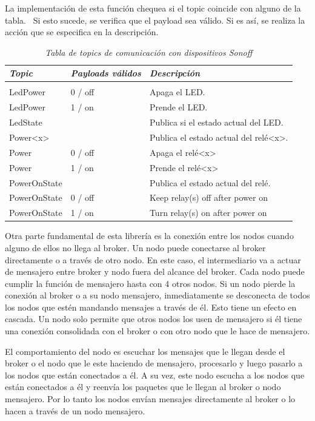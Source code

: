 La implementación de esta función chequea si el topic coincide con alguno de la tabla.~ Si esto sucede, se verifica que el payload sea válido. Si es así, se realiza la acción que se especifica en la descripción.
\begin{table}[h]
\begin{tabular}{p{}p{}p{}}
\toprule
\textit{Topic} & \textit{Payloads válidos} & \textit{Descripción} \\
\midrule \\
\rowcolor{green!5} LedPower & 0 / off & Apaga el LED. \\
LedPower & 1 / on & Prende el LED. \\
\rowcolor{green!5} LedState & & Publica si el estado actual del LED. \\
Power<x> & & Publica el estado actual del relé<x>. \\
\rowcolor{green!5} Power & 0 / off & Apaga el relé<x> \\
Power & 1 / on & Prende el relé<x> \\
\rowcolor{green!5} PowerOnState &  & Publica el estado actual del relé. \\
PowerOnState & 0 / off & Keep relay(s) off after power on \\
\rowcolor{green!5} PowerOnState & 1 / on & Turn relay(s) on after power on \\
\bottomrule
\end{tabular}
 \caption{\textit{Tabla de topics de comunicación con dispositivos Sonoff}}
 \label{tbl:topics}
\end{table}

Otra parte fundamental de esta librería es la conexión entre los nodos cuando alguno de ellos no llega al broker. Un nodo puede conectarse al broker directamente o a través de otro nodo. En este caso, el intermediario va a actuar de mensajero entre broker y nodo fuera del alcance del broker. Cada nodo puede cumplir la función de mensajero hasta con 4 otros nodos. Si un nodo pierde la conexión al broker o a su nodo mensajero, inmediatamente se desconecta de todos los nodos que estén mandando mensajes a través de él. Esto tiene un efecto en cascada. Un nodo solo permite que otros nodos los usen de mensajero si él tiene una conexión consolidada con el broker o con otro nodo que le hace de mensajero.

El comportamiento del nodo es escuchar los mensajes que le llegan desde el broker o el nodo que le este haciendo de mensajero, procesarlo y luego pasarlo a los nodos que están conectados a él. A su vez, este nodo escucha a los nodos que están conectados a él y reenvía los paquetes que le llegan al broker o nodo mensajero. Por lo tanto los nodos envían mensajes directamente al broker o lo hacen a través de un nodo mensajero.

